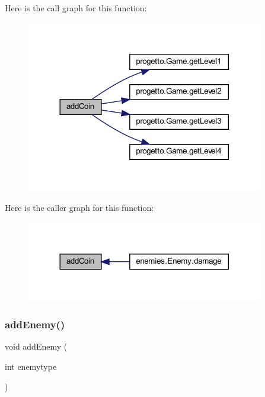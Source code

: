 Here is the call graph for this function\+:\nopagebreak
\begin{figure}[H]
\begin{center}
\leavevmode
\includegraphics[width=293pt]{classmanagers_1_1_enemy_manager_a9f0f7dc28e596d2ebcd06e27ef05d9fd_cgraph}
\end{center}
\end{figure}
Here is the caller graph for this function\+:\nopagebreak
\begin{figure}[H]
\begin{center}
\leavevmode
\includegraphics[width=293pt]{classmanagers_1_1_enemy_manager_a9f0f7dc28e596d2ebcd06e27ef05d9fd_icgraph}
\end{center}
\end{figure}
\mbox{\label{classmanagers_1_1_enemy_manager_a24695d90cee943c6c64c2d9f1b231285}} 
\subsubsection{\texorpdfstring{add\+Enemy()}{addEnemy()}}
{\footnotesize\ttfamily void add\+Enemy (\begin{DoxyParamCaption}\item[{int}]{enemytype }\end{DoxyParamCaption})}



